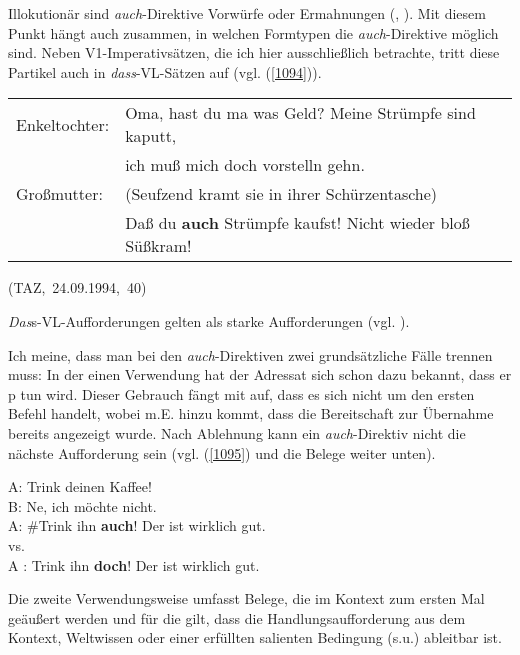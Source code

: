 {Illokutionär sind \textit{auch}-Direktive Vorwürfe  oder  Ermahnungen (\citealt[58]{Dahl1988}, \citealt[78]{Kwon2005}). Mit diesem Punkt hängt auch zusammen, in welchen Formtypen die \textit{auch}-Direktive möglich sind. Neben V1-Imperativsätzen, die ich hier aus\-schließlich betrachte, tritt diese Partikel auch in \textit{dass}-VL-Sätzen auf (vgl. (\ref{1094})).

\begin{exe}
	\ex\label{1094} 
    \begin{tabular}[t]{ll}
	Enkeltochter: & Oma, hast du ma was Geld? Meine Strümpfe sind kaputt, \\
	& ich muß mich doch vorstelln gehn.\\
	Großmutter: & (Seufzend kramt sie in ihrer Schürzentasche) \\
	& Daß du \textbf{auch} Strümpfe kaufst! Nicht wieder bloß Süßkram!
	\end{tabular}
	\newline
	\hbox{}\hfill\hbox{(TAZ, 24.09.1994, 40)}
	\newline
	\hbox{}\hfill\hbox{\citet[78]{Kwon2005}}				       
\end{exe}
\textit{Das}s-VL-Aufforderungen gelten als starke Aufforderungen (vgl. \citealt[54]{Thurmair1989}). 

Ich meine, dass man bei den \textit{auch}-Direktiven zwei grundsätzliche Fälle trennen muss: In der einen Verwendung hat der Adressat sich schon dazu bekannt, dass er p tun wird. Dieser Gebrauch fängt mit auf, dass es sich nicht um den ersten Befehl handelt, wobei m.E. hinzu kommt, dass die Bereitschaft zur Übernahme bereits angezeigt wurde. Nach Ablehnung kann ein \textit{auch}-Direktiv nicht die nächste Aufforderung sein (vgl. (\ref{1095}) und die Belege weiter unten).

\begin{exe}
	\ex\label{1095} 
 	A: Trink deinen Kaffee!\\
	B: Ne, ich möchte nicht.\\
	A: \#Trink ihn \textbf{auch}! Der ist wirklich gut.\\
	vs.\\
	A : Trink ihn \textbf{doch}! Der ist wirklich gut.
\end{exe}
Die zweite Verwendungsweise umfasst Belege, die im Kontext zum ersten Mal geäußert werden und für die gilt, dass die Handlungsaufforderung aus dem Kontext, Weltwissen oder einer erfüllten salienten Bedingung (s.u.) ableitbar ist.

}
